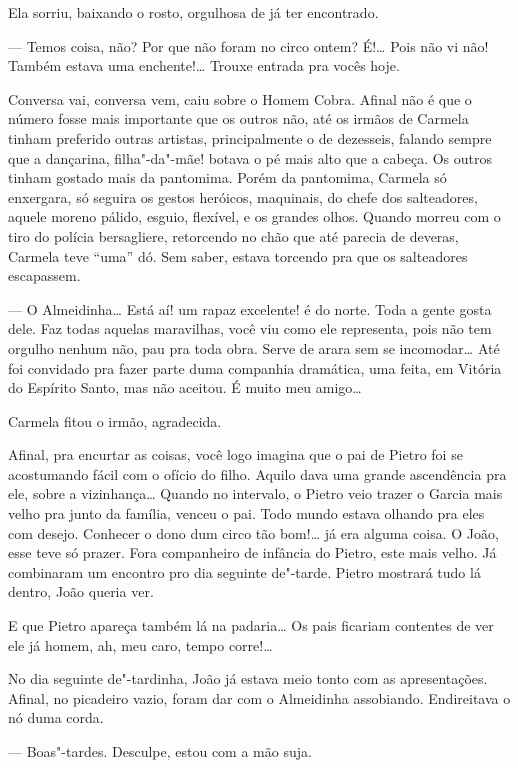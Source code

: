 Ela sorriu, baixando o rosto, orgulhosa de já ter encontrado.

--- Temos coisa, não? Por que não foram no circo ontem? É!\ldots{} Pois não
vi não! Também estava uma enchente!\ldots{} Trouxe entrada pra vocês hoje.

Conversa vai, conversa vem, caiu sobre o Homem Cobra. Afinal não é que o
número fosse mais importante que os outros não, até os irmãos de Carmela
tinham preferido outras artistas, principalmente o de dezesseis, falando
sempre que a dançarina, filha"-da"-mãe! botava o pé mais alto que a
cabeça. Os outros tinham gostado mais da pantomima. Porém da pantomima,
Carmela só enxergara, só seguira os gestos heróicos, maquinais, do chefe
dos salteadores, aquele moreno pálido, esguio, flexível, e os grandes
olhos. Quando morreu com o tiro do polícia bersagliere, retorcendo no
chão que até parecia de deveras, Carmela teve ``uma'' dó. Sem saber,
estava torcendo pra que os salteadores escapassem.

--- O Almeidinha\ldots{} Está aí! um rapaz excelente! é do norte. Toda a
gente gosta dele. Faz todas aquelas maravilhas, você viu como ele
representa, pois não tem orgulho nenhum não, pau pra toda obra. Serve de
arara sem se incomodar\ldots{} Até foi convidado pra fazer parte duma
companhia dramática, uma feita, em Vitória do Espírito Santo, mas não
aceitou. É muito meu amigo\ldots{}

Carmela fitou o irmão, agradecida.

Afinal, pra encurtar as coisas, você logo imagina que o pai de Pietro
foi se acostumando fácil com o ofício do filho. Aquilo dava uma grande
ascendência pra ele, sobre a vizinhança\ldots{} Quando no intervalo, o Pietro
veio trazer o Garcia mais velho pra junto da família, venceu o pai. Todo
mundo estava olhando pra eles com desejo. Conhecer o dono dum circo tão
bom!\ldots{} já era alguma coisa. O João, esse teve só prazer. Fora
companheiro de infância do Pietro, este mais velho. Já combinaram um
encontro pro dia seguinte de"-tarde. Pietro mostrará tudo lá dentro, João
queria ver. 

E que Pietro apareça também lá na padaria\ldots{} Os pais ficariam contentes
de ver ele já homem, ah, meu caro, tempo corre!\ldots{}

No dia seguinte de"-tardinha, João já estava meio tonto com as
apresentações. Afinal, no picadeiro vazio, foram dar com o Almeidinha
assobiando. Endireitava o nó duma corda.

--- Boas"-tardes. Desculpe, estou com a mão suja.

